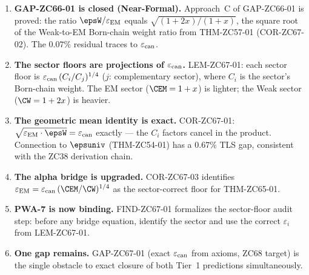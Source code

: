 \documentclass[12pt, a4paper]{article}
\renewcommand{\epsEM}{\varepsilon_{\rm EM}}
\renewcommand{\epscan}{\varepsilon_{\rm can}}
\begin{document}
\begin{enumerate}[leftmargin=*]

\item \textbf{GAP-ZC66-01 is closed (Near-Formal).}
Approach~C of GAP-ZC66-01 is proved: the ratio $\epsW/\epsEM$
equals $\sqrt{(1+2x)/(1+x)}$, the square root of the Weak-to-EM
Born-chain weight ratio from THM-ZC57-01 (COR-ZC67-02).
The $0.07\%$ residual traces to $\epscan$.

\item \textbf{The sector floors are projections of $\epscan$.}
LEM-ZC67-01: each sector floor is $\epscan\,(C_i/C_j)^{1/4}$ ($j$: complementary sector),
where $C_i$ is the sector's Born-chain weight.
The EM sector ($\CEM = 1+x$) is lighter; the Weak sector
($\CW = 1+2x$) is heavier.

\item \textbf{The geometric mean identity is exact.}
COR-ZC67-01: $\sqrt{\epsEM\cdot\epsW} = \epscan$ exactly ---
the $C_i$ factors cancel in the product.
Connection to $\epsuniv$ (THM-ZC54-01) has a $0.67\%$ TLS gap,
consistent with the ZC38 derivation chain.

\item \textbf{The alpha bridge is upgraded.}
COR-ZC67-03 identifies $\epsEM = \epscan\,(\CEM/\CW)^{1/4}$
as the sector-correct floor for THM-ZC65-01.

\item \textbf{PWA-7 is now binding.}
FIND-ZC67-01 formalizes the sector-floor audit step:
before any bridge equation, identify the sector and use
the correct $\varepsilon_i$ from LEM-ZC67-01.

\item \textbf{One gap remains.}
GAP-ZC67-01 (exact $\epscan$ from axioms, ZC68 target)
is the single obstacle to exact closure of both
Tier~1 predictions simultaneously.

\end{enumerate}
\end{document}
